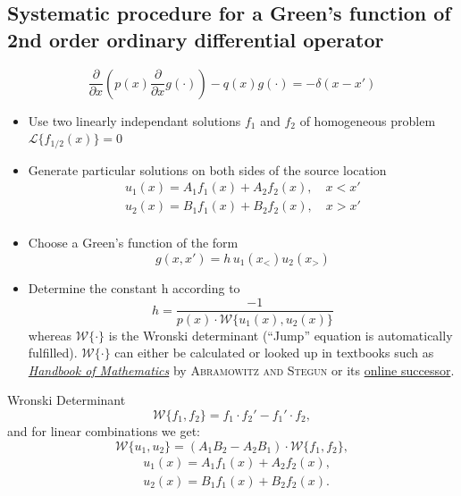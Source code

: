 \subsection{Systematic procedure for a Green's function of 2nd order ordinary differential operator}
\begin{equation*}
  \dfrac{\partial}{\partial x}\left(p(x) \dfrac{\partial}{\partial x} g(\cdot)\right) - q(x)g(\cdot) = -\delta(x-x')
\end{equation*}
\begin{itemize}
  \item Use two linearly independant solutions $f_1$ and $f_2$ of homogeneous problem \(\mathcal{L}\{f_{1/2}(x)\} = 0\)
  \item Generate particular solutions on both sides of the source location
        \begin{align*}
          u_{1}(x) = A_{1} f_{1}(x) + A_{2} f_{2}(x), \quad x < x'\\
          u_{2}(x) = B_{1} f_{1}(x) + B_{2} f_{2}(x), \quad x > x'\\
        \end{align*}
  \item Choose a Green's function of the form
        \begin{equation*}
          g(x, x') = h \, u_{1}(x_{<})u_{2}(x_{>})
        \end{equation*}
  \item Determine the constant h according to
        \begin{equation*}
          h = \dfrac{-1}{p(x) \cdot \mathcal{W}\{u_{1}(x), u_{2}(x)\}}
        \end{equation*}
        whereas $\mathcal{W}\{\cdot\}$ is the Wronski determinant (``Jump'' equation is automatically fulfilled). $\mathcal{W}\{\cdot\}$ can either be calculated or looked up in textbooks such as \href{http://www.convertit.com/Go/ConvertIt/Reference/AMS55.asp}{\textit{Handbook of Mathematics}} by \textsc{Abramowitz and Stegun} or its \href{https://dlmf.nist.gov/}{online successor}.%
\end{itemize}

\begin{definition}{Wronski Determinant}
  \begin{equation*}
    \mathcal{W}\{f_{1}, f_{2}\} = f_{1}\cdot f_{2}' - f_{1}'\cdot f_{2},
  \end{equation*}
  and for linear combinations we get:
  \begin{equation*}
    \mathcal{W}\{u_{1}, u_{2}\} = (A_{1}B_{2} - A_{2}B_{1}) \cdot \mathcal{W}\{f_{1}, f_{2}\},
  \end{equation*}
  \begin{align*}
    &u_{1}(x) = A_{1}f_{1}(x) + A_{2}f_{2}(x),\\
    &u_{2}(x) = B_{1}f_{1}(x) + B_{2}f_{2}(x).
  \end{align*}
\end{definition}

